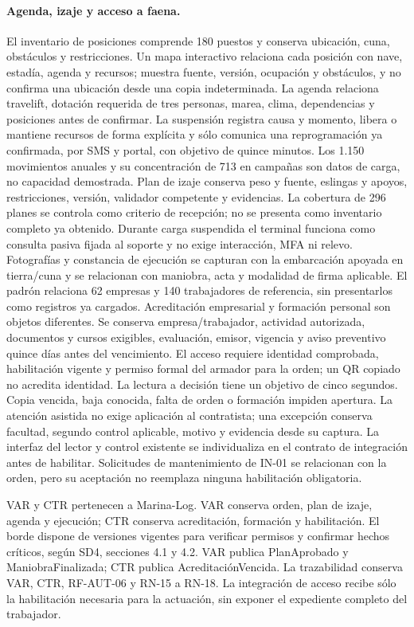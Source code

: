 \paragraph{Agenda, izaje y acceso a faena.}
El inventario de posiciones comprende 180 puestos y conserva ubicación, cuna, obstáculos y restricciones. Un mapa interactivo relaciona cada posición con nave, estadía, agenda y recursos; muestra fuente, versión, ocupación y obstáculos, y no confirma una ubicación desde una copia indeterminada. La agenda relaciona travelift, dotación requerida de tres personas, marea, clima, dependencias y posiciones antes de confirmar. La suspensión registra causa y momento, libera o mantiene recursos de forma explícita y sólo comunica una reprogramación ya confirmada, por SMS y portal, con objetivo de quince minutos. Los 1.150 movimientos anuales y su concentración de 713 en campañas son datos de carga, no capacidad demostrada.
Plan de izaje conserva peso y fuente, eslingas y apoyos, restricciones, versión, validador competente y evidencias. La cobertura de 296 planes se controla como criterio de recepción; no se presenta como inventario completo ya obtenido. Durante carga suspendida el terminal funciona como consulta pasiva fijada al soporte y no exige interacción, MFA ni relevo. Fotografías y constancia de ejecución se capturan con la embarcación apoyada en tierra/cuna y se relacionan con maniobra, acta y modalidad de firma aplicable.
El padrón relaciona 62 empresas y 140 trabajadores de referencia, sin presentarlos como registros ya cargados. Acreditación empresarial y formación personal son objetos diferentes. Se conserva empresa/trabajador, actividad autorizada, documentos y cursos exigibles, evaluación, emisor, vigencia y aviso preventivo quince días antes del vencimiento. El acceso requiere identidad comprobada, habilitación vigente y permiso formal del armador para la orden; un QR copiado no acredita identidad. La lectura a decisión tiene un objetivo de cinco segundos. Copia vencida, baja conocida, falta de orden o formación impiden apertura. La atención asistida no exige aplicación al contratista; una excepción conserva facultad, segundo control aplicable, motivo y evidencia desde su captura.
La interfaz del lector y control existente se individualiza en el contrato de integración antes de habilitar. Solicitudes de mantenimiento de IN-01 se relacionan con la orden, pero su aceptación no reemplaza ninguna habilitación obligatoria.

VAR y CTR pertenecen a Marina-Log. VAR conserva orden, plan de izaje, agenda y ejecución; CTR conserva acreditación, formación y habilitación. El borde dispone de versiones vigentes para verificar permisos y confirmar hechos críticos, según SD4, secciones 4.1 y 4.2. VAR publica PlanAprobado y ManiobraFinalizada; CTR publica AcreditaciónVencida. La trazabilidad conserva VAR, CTR, RF-AUT-06 y RN-15 a RN-18. La integración de acceso recibe sólo la habilitación necesaria para la actuación, sin exponer el expediente completo del trabajador.

